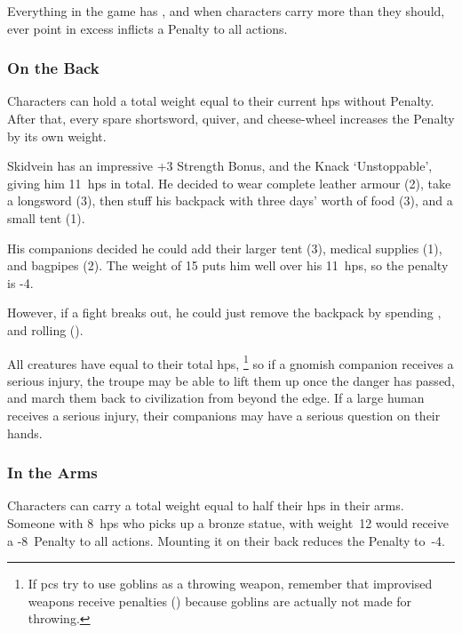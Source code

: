 \begin{multicols}{2}

\noindent%
Everything in the game has , and when characters carry more than they should, ever point in excess inflicts a Penalty to all actions.

\subsubsection{On the Back}
Characters can hold a total \gls{weight} equal to their current \glspl{hp} without Penalty.
After that, every spare shortsword, quiver, and cheese-wheel increases the Penalty by its own \gls{weight}.

\begin{exampletext}
  Skidvein has an impressive +3 Strength Bonus, and the Knack `Unstoppable', giving him 11~\glspl{hp} in total.
  He decided to wear complete leather armour (2), take a longsword (3), then stuff his backpack with three days' worth of food (3), and a small tent (1).

  His companions decided he could add their larger tent (3), medical supplies (1), and bagpipes (2).
  The \gls{weight} of 15 puts him well over his 11~\glspl{hp}, so the penalty is -4.

  However, if a fight breaks out, he could just remove the backpack by spending , and rolling  (\tn[10]).
\end{exampletext}

All creatures have  equal to their total \glspl{hp},%
\footnote{If \glspl{pc} try to use goblins as a throwing weapon, remember that improvised weapons receive penalties () because goblins are actually not made for throwing.}
so if a gnomish companion receives a serious injury, the troupe may be able to lift them up once the danger has passed, and march them back to civilization from beyond the \gls{edge}.
If a large human receives a serious injury, their companions may have a serious question on their hands.

\subsubsection{In the Arms}
Characters can carry a total \gls{weight} equal to half their \glspl{hp} in their arms.
Someone with 8~\glspl{hp} who picks up a bronze statue, with \gls{weight}~12 would receive a -8~Penalty to all actions.
Mounting it on their back reduces the Penalty to~-4.


\end{multicols}
